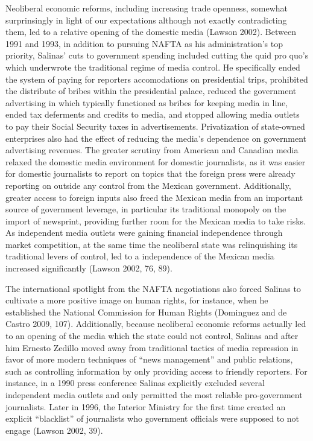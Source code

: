 \documentclass[a4paper]{article}\usepackage[]{graphicx}\usepackage[]{color}
\begin{document}
Neoliberal economic reforms, including increasing trade openness, somewhat surprinsingly in light of our expectations although not exactly contradicting them, led to a relative opening of the domestic media (Lawson 2002). Between 1991 and 1993, in addition to pursuing NAFTA as his administration's top priority, Salinas' cuts to government spending included cutting the quid pro quo's which underwrote the traditional regime of media control. He specifically ended the system of paying for reporters accomodations on presidential trips, prohibited the distribute of bribes within the presidential palace, reduced the government advertising in which typically functioned as bribes for keeping media in line, ended tax deferments and credits to media, and stopped allowing media outlets to pay their Social Security taxes in advertisements. Privatization of state-owned enterprises also had the effect of reducing the media's dependence on government advertising revenues. The greater scrutiny from American and Canadian media relaxed the domestic media environment for domestic journalists, as it was easier for domestic journalists to report on topics that the foreign press were already reporting on outside any control from the Mexican government. Additionally, greater access to foreign inputs also freed the Mexican media from an important source of government leverage, in particular its traditional monopoly on the import of newsprint, providing further room for the Mexican media to take risks. As independent media outlets were gaining financial independence through market competition, at the same time the neoliberal state was relinquishing its traditional levers of control, led to a independence of the Mexican media increased significantly (Lawson 2002, 76, 89).

The international spotlight from the NAFTA negotiations also forced Salinas to cultivate a more positive image on human rights, for instance, when he established the National Commission for Human Rights (Dominguez and de Castro 2009, 107). Additionally, because neoliberal economic reforms actually led to an opening of the media which the state could not control, Salinas and after him Ernesto Zedillo moved away from traditional tactics of media repression in favor of more modern techniques of “news management” and public relations, such as controlling information by only providing access to friendly reporters. For instance, in a 1990 press conference Salinas explicitly excluded several independent media outlets and only permitted the most reliable pro-government journalists. Later in 1996, the Interior Ministry for the first time created an explicit “blacklist” of journalists who government officials were supposed to not engage (Lawson 2002, 39).
\end{document}
